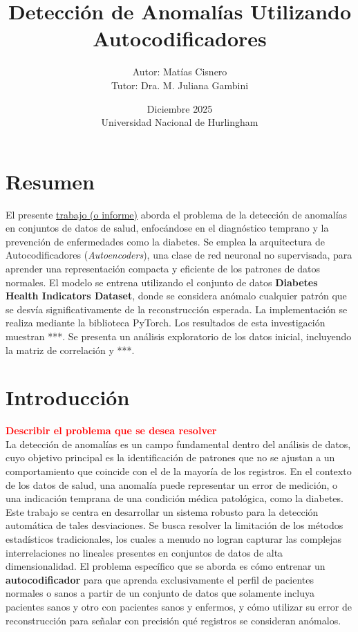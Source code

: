 \documentclass[a4paper,10pt]{book}
\title{Detección de Anomalías Utilizando Autocodificadores}
\author{Autor: Matías Cisnero\\ Tutor: Dra. M. Juliana Gambini}
\date{Diciembre 2025 \\ Universidad Nacional de Hurlingham}
\newcommand{\comentario}[1]{\textbf{\textcolor{red}{#1}}}
\begin{document}
\maketitle


\tableofcontents
\listoffigures
\listoftables

\chapter*{Resumen}

El presente \underline{trabajo (o informe)} aborda el problema de la detección de anomalías en conjuntos de datos de salud, enfocándose en el diagnóstico temprano y la prevención de enfermedades como la diabetes. Se emplea la arquitectura de Autocodificadores (\textit{Autoencoders}), una clase de red neuronal no supervisada, para aprender una representación compacta y eficiente de los patrones de datos normales. El modelo se entrena utilizando el conjunto de datos \textbf{Diabetes Health Indicators Dataset}, donde se considera anómalo cualquier patrón que se desvía significativamente de la reconstrucción esperada. La implementación se realiza mediante la biblioteca PyTorch. Los resultados de esta investigación muestran ***. Se presenta un análisis exploratorio de los datos inicial, incluyendo la matriz de correlación y ***.

\chapter{Introducción}

\comentario{Describir el problema que se desea resolver}\\

La detección de anomalías es un campo fundamental dentro del análisis de datos, cuyo objetivo principal es la identificación de patrones que no se ajustan a un comportamiento que coincide con el de la mayoría de los registros. En el contexto de los datos de salud, una anomalía puede representar un error de medición, o una indicación temprana de una condición médica patológica, como la diabetes. Este trabajo se centra en desarrollar un sistema robusto para la detección automática de tales desviaciones. Se busca resolver la limitación de los métodos estadísticos tradicionales, los cuales a menudo no logran capturar las complejas interrelaciones no lineales presentes en conjuntos de datos de alta dimensionalidad. El problema específico que se aborda es cómo entrenar un \textbf{autocodificador} para que aprenda exclusivamente el perfil de pacientes normales o sanos a partir de un conjunto de datos que solamente incluya pacientes sanos y otro con pacientes sanos y enfermos, y cómo utilizar su error de reconstrucción para señalar con precisión qué registros se consideran anómalos.
\end{document}
